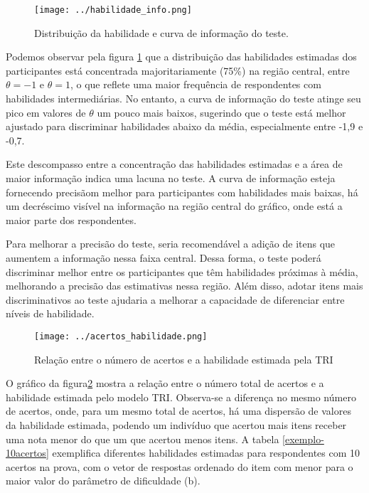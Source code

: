 \begin{figure}[H]
	\centering
	\texttt{[image: ../habilidade\_info.png]}
	\caption{Distribuição da habilidade e curva de informação do teste.}
	\label{fig:info_habilidade}
\end{figure}

Podemos observar pela figura \ref{fig:info_habilidade} que a distribuição das habilidades estimadas dos participantes está concentrada majoritariamente (75\%) na região central, entre $\theta = -1$ e $\theta = 1$, o que reflete uma maior frequência de respondentes com habilidades intermediárias. No entanto, a curva de informação do teste atinge seu pico em valores de $\theta$ um pouco mais baixos, sugerindo que o teste está melhor ajustado para discriminar habilidades abaixo da média, especialmente entre -1,9 e -0,7.

Este descompasso entre a concentração das habilidades estimadas e a área de maior informação indica uma lacuna no teste. A curva de informação esteja fornecendo precisãom melhor para participantes com habilidades mais baixas, há um decréscimo visível na informação na região central do gráfico, onde está a maior parte dos respondentes. 

Para melhorar a precisão do teste, seria recomendável a adição de itens que aumentem a informação nessa faixa central. Dessa forma, o teste poderá discriminar melhor entre os participantes que têm habilidades próximas à média, melhorando a precisão das estimativas nessa região. Além disso, adotar itens mais discriminativos ao teste ajudaria a melhorar a capacidade de diferenciar entre níveis de habilidade.

\begin{figure}[!hbt]
	\centering
	\texttt{[image: ../acertos\_habilidade.png]}
	\caption{Relação entre o número de acertos e a habilidade estimada pela TRI}
	\label{fig:acertos_habilidade}
\end{figure}

O gráfico da figura\ref{fig:acertos_habilidade} mostra a relação entre o número total de acertos e a habilidade estimada pelo modelo TRI. Observa-se a diferença no mesmo número de acertos, onde, para um mesmo total de acertos, há uma dispersão de valores da habilidade estimada, podendo um indivíduo que acertou mais itens receber uma nota menor do que um que acertou menos itens. A tabela \ref{exemplo-10acertos} exemplifica diferentes habilidades estimadas para respondentes com 10 acertos na prova, com o vetor de respostas ordenado do item com menor para o maior valor do parâmetro de dificuldade (b).


